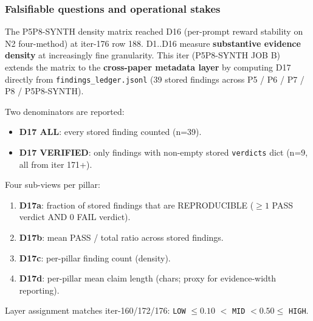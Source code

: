 
\subsubsection{Falsifiable questions and operational stakes}\label{sec:synth-iter180-seventeen-domain}
The P5P8-SYNTH density matrix reached D16 (per-prompt reward
stability on N2 four-method) at iter-176 row 188. D1..D16 measure
\textbf{substantive evidence density} at increasingly fine
granularity. This iter (P5P8-SYNTH JOB B) extends the matrix to the
\textbf{cross-paper metadata layer} by computing D17 directly from
\texttt{findings\_ledger.jsonl} (39 stored findings across
P5 / P6 / P7 / P8 / P5P8-SYNTH).

Two denominators are reported:
\begin{itemize}
\item \textbf{D17 ALL}: every stored finding counted (n=39).
\item \textbf{D17 VERIFIED}: only findings with non-empty stored
  \texttt{verdicts} dict (n=9, all from iter 171+).
\end{itemize}

Four sub-views per pillar:
\begin{enumerate}
\item \textbf{D17a}: fraction of stored findings that are
  REPRODUCIBLE ($\ge 1$ PASS verdict AND $0$ FAIL verdict).
\item \textbf{D17b}: mean PASS / total ratio across stored findings.
\item \textbf{D17c}: per-pillar finding count (density).
\item \textbf{D17d}: per-pillar mean claim length (chars; proxy
  for evidence-width reporting).
\end{enumerate}

Layer assignment matches iter-160/172/176: \texttt{LOW} $\le 0.10$
$< $ \texttt{MID} $ < 0.50 \le $ \texttt{HIGH}.

